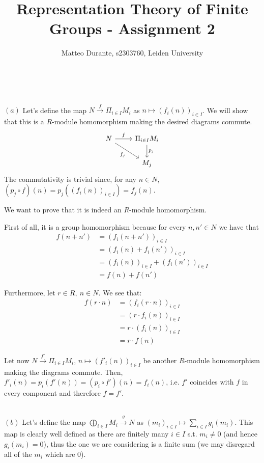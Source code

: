 \documentclass{article}
\newcommand{\exercise}[1]{\noindent {\bf Exercise #1}}
\begin{document}
\title{Representation Theory of Finite Groups - Assignment 2}

\author{Matteo Durante, s2303760, Leiden University}

\maketitle


~\\
\exercise{3.5}

$(a)$ Let's define the map $N\xrightarrow{f}\Pi_{i\in I} M_i$ as $n\mapsto
(f_i(n))_{i\in I}$. We will show that this is a $R$-module homomorphism making
the desired diagrams commute.
\[
    \begin{tikzcd}
        N\arrow{r}{f}\arrow[swap]{dr}{f_j}
        & \Pi_{i\in I} M_i\arrow{d}{p_j} \\
        & M_j
    \end{tikzcd}
\]
The commutativity is trivial since, for any $n\in N$, $(p_j\circ f)(n)=p_j((f_i
(n))_{i\in I})=f_j(n)$.

We want to prove that it is indeed an $R$-module homomorphism.

First of all, it is a group homomorphism because for every $n,n'\in N$ we have
that
\begin{align*}
    f(n+n') & =(f_i(n+n'))_{i\in I} \\
    & =(f_i(n)+f_i(n'))_{i\in I} \\
    & =(f_i(n))_{i\in I}+(f_i(n'))_{i\in I} \\
    & =f(n)+f(n')
\end{align*}

Furthermore, let $r\in R,\ n\in N$. We see that:
\begin{align*}
    f(r\cdot n) & =(f_i(r\cdot n))_{i\in I} \\
    & =(r\cdot f_i(n))_{i\in I} \\
    & =r\cdot (f_i(n))_{i\in I} \\
    & =r\cdot f(n)
\end{align*}

Let now $N\xrightarrow{f'}\Pi_{i\in I} M_i$, $n\mapsto (f'_i(n))_{i\in I}$ be 
another $R$-module homomorphism making the diagrams commute. Then, $f'_i(n)=p_i
(f'(n))=(p_i\circ f')(n)=f_i(n)$, i.e. $f'$ coincides with $f$ in every
component and therefore $f=f'$.

~\\
$(b)$ Let's define the map $\bigoplus_{i\in I} M_i\xrightarrow{g} N$ as
$(m_i)_{i\in I}\mapsto\sum_{i\in I} g_i(m_i)$. This map is clearly well defined
as there are finitely many $i\in I$ s.t. $m_i\neq 0$ (and hence $g_i(m_i)=0$),
thus the one we are considering is a finite sum (we may disregard all of the 
$m_i$ which are 0).
\end{document}
